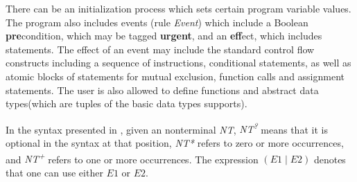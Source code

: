 There can be an initialization process which sets certain program variable values.
The program also includes events (rule \emph{Event}) which include a Boolean \textbf{pre}condition, which may be tagged \textbf{urgent},
and an \textbf{eff}ect, which includes statements.
The effect of an event may include the standard control flow constructs including a sequence of instructions,
conditional statements, as well as atomic blocks of statements for mutual exclusion, function calls and assignment statements.
The user is also allowed to define functions and abstract data types(which are tuples of the basic data types \lgname supports).

In the syntax presented in , given an nonterminal \textit{NT},
{\it NT\textsuperscript{?}} means that it is optional in the syntax at that position,
{\it NT*} refers to zero or more occurrences,
and {\it NT\textsuperscript{+}} refers to one or more occurrences.
The expression $(E1\mid E2)$ denotes that one can use either $E1$ or $E2$.

